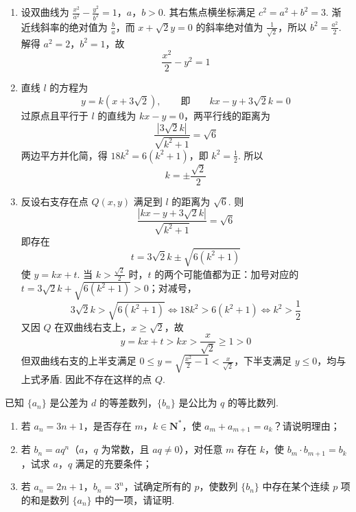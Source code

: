 \begin{solution}
\begin{enumerate}
\item 设双曲线为
\(\frac{x^2}{a^2}-\frac{y^2}{b^2}=1\)，\(a\)，\(b>0\).
  其右焦点横坐标满足 \(c^2=a^2+b^2=3\). 渐近线斜率的绝对值为 \(\frac{b}{a}\)，而 \(x+\sqrt2y=0\) 的斜率绝对值为 \(\frac{1}{\sqrt2}\)，所以 \(b^2=\frac{a^2}{2}\). 解得 \(a^2=2\)，\(b^2=1\)，故
  \[
  \frac{x^2}{2}-y^2=1
  \]
\item 直线 \(l\) 的方程为
  \[
  y=k(x+3\sqrt2),\qquad\text{即}\qquad kx-y+3\sqrt2k=0
  \]
  过原点且平行于 \(l\) 的直线为 \(kx-y=0\)，两平行线的距离为
  \[
  \frac{|3\sqrt2k|}{\sqrt{k^2+1}}=\sqrt6
  \]
  两边平方并化简，得 \(18k^2=6(k^2+1)\)，即 \(k^2=\frac12\). 所以
  \[
  k=\pm\frac{\sqrt2}{2}
  \]
\item 反设右支存在点 \(Q(x,y)\) 满足到 \(l\) 的距离为 \(\sqrt6\). 则
  \[
  \frac{|kx-y+3\sqrt2k|}{\sqrt{k^2+1}}=\sqrt6
  \]
  即存在
  \[
  t=3\sqrt2k\pm\sqrt{6(k^2+1)}
  \]
  使 \(y=kx+t\). 当 \(k>\frac{\sqrt2}{2}\) 时，\(t\) 的两个可能值都为正：加号对应的 \(t=3\sqrt2k+\sqrt{6(k^2+1)}>0\)；对减号，
  \[
  3\sqrt2k>\sqrt{6(k^2+1)}
  \iff 18k^2>6(k^2+1)\iff k^2>\frac12
  \]
  又因 \(Q\) 在双曲线右支上，\(x\geqslant\sqrt2\)，故
  \[
  y=kx+t>kx>\frac{x}{\sqrt2}\geqslant1>0
  \]
  但双曲线右支的上半支满足 \(0\leqslant y=\sqrt{\frac{x^2}{2}-1}<\frac{x}{\sqrt2}\)，下半支满足 \(y\leqslant0\)，均与上式矛盾. 因此不存在这样的点 \(Q\).
\end{enumerate}
\end{solution}

\begin{problem}
已知 \(\{a_n\}\) 是公差为 \(d\) 的等差数列，\(\{b_n\}\) 是公比为 \(q\) 的等比数列.

\begin{enumerate}
\item 若 \(a_n = 3n + 1\)，是否存在 \(m\)，\(k \in \mathbf{N}^*\)，使 \(a_m + a_{m+1} = a_k\)？请说明理由；

\item 若 \(b_n = aq^n\)（\(a\)，\(q\) 为常数，且 \(aq \neq 0\)），对任意 \(m\) 存在 \(k\)，使 \(b_m \cdot b_{m+1} = b_k\)，试求 \(a\)，\(q\) 满足的充要条件；

\item 若 \(a_n = 2n + 1\)，\(b_n = 3^n\)，试确定所有的 \(p\)，使数列 \(\{b_n\}\) 中存在某个连续 \(p\) 项的和是数列 \(\{a_n\}\) 中的一项，请证明.
\end{enumerate}
\end{problem}

